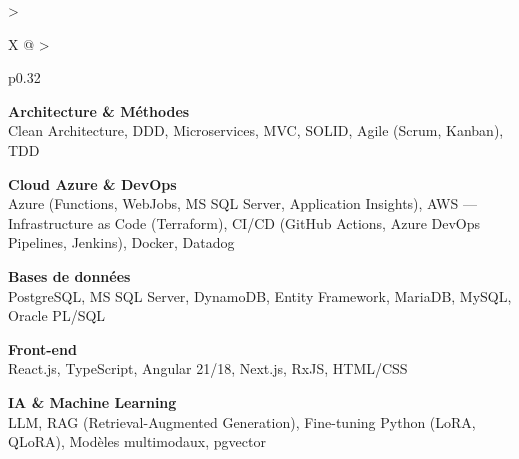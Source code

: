 \documentclass[10pt,a4paper]{article}
\begin{document}
\begin{tabularx}{\textwidth}{
  >{\raggedright\arraybackslash}X
  @{\hspace{1cm}}
  >{\raggedright\arraybackslash}p{0.32\textwidth}
}
\begin{minipage}[t]{\linewidth}
\textbf{\color{primary} Architecture \& Méthodes}\\
\color{darkgray} Clean Architecture, DDD, Microservices, MVC, SOLID, Agile (Scrum, Kanban), TDD

\vspace{4pt}

\textbf{\color{primary} Cloud Azure \& DevOps}\\
\color{darkgray} Azure (Functions, WebJobs, MS SQL Server, Application Insights), AWS --- Infrastructure as Code (Terraform), CI/CD (GitHub Actions, Azure DevOps Pipelines, Jenkins), Docker, Datadog

\vspace{4pt}

\textbf{\color{primary} Bases de données}\\
\color{darkgray} PostgreSQL, MS SQL Server, DynamoDB, Entity Framework, MariaDB, MySQL, Oracle PL/SQL

\vspace{4pt}

\textbf{\color{primary} Front-end}\\
\color{darkgray} React.js, TypeScript, Angular 21/18, Next.js, RxJS, HTML/CSS

\vspace{4pt}

\textbf{\color{primary} IA \& Machine Learning}\\
\color{darkgray} LLM, RAG (Retrieval-Augmented Generation), Fine-tuning Python (LoRA, QLoRA), Modèles multimodaux, pgvector

\vspace{4pt}

\end{minipage}
\\
\end{tabularx}
\end{document}
